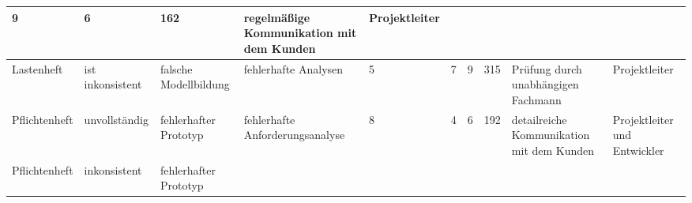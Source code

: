 \begin{center}
{\begin{tabular}{|p{1.5cm}|p{1.5cm}|p{1.7cm}|p{1.5cm}|p{0.25cm}|p{0.25cm}|p{0.25cm}|p{0.5cm}|p{1.5cm}|p{1.5cm}|}
{
	9
}&

{
	6
}&

{
	162
}&

{
	regelm\"{a}\ss{}ige Kommunikation mit dem Kunden
}&

{
	Projektleiter
}\\ \hline
{
	Lastenheft
}&

{
	ist inkonsistent
}&

{
	falsche Modellbildung
}&

{
	fehlerhafte Analysen
}&

{
	5
}&

{
	7
}&

{
	9
}&

{
	315
}&

{
	Pr\"{u}fung durch unabh\"{a}ngigen Fachmann
}&

{
	Projektleiter
}	\\ \hline

{
	Pflichtenheft
}&

{
	unvollst\"{a}ndig
}&

{
	fehlerhafter Prototyp
}&

{
	fehlerhafte Anforderungsanalyse
}&

{
	8
}&

{
	4
}&

{
	6
}&

{
	192
}&

{
	detailreiche Kommunikation mit dem Kunden
}&

{
	Projektleiter und Entwickler
}	\\ \hline
%
%
{
	Pflichtenheft
}&

{
	inkonsistent
}&

{
	fehlerhafter Prototyp
}&

{
	
}&


\end{tabular}}
\end{center}
